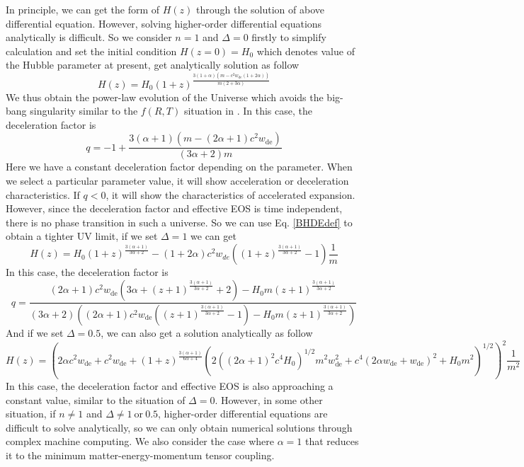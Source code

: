 \documentclass[a4paper,fleqn]{cas-sc}
\begin{document}
In principle, we can get the form of $H(z)$ through the solution of above differential equation. However, solving higher-order differential equations analytically is difficult. So we consider $n=1$ and $\Delta=0$ firstly to simplify calculation and set the initial condition $H(z=0)=H_0$ which denotes value of the Hubble parameter at present, get analytically solution as follow
\begin{equation}
    H(z)= H_0 (1+z)^{\frac{3 (1+\alpha) \left(m-c^2 w_\text{de}(1+2\alpha)\right)}{m(2+3\alpha)}}
\end{equation}
We thus obtain the power-law evolution of the Universe which avoids the big-bang singularity similar to the $f(R,T)$ situation in \cite{singhStatefinderDiagnosisHolographic2016}. In this case, the deceleration factor is
\begin{equation}
    q = -1+\frac{3 (\alpha +1) \left(m-(2 \alpha +1) c^2 w_\text{de}\right)}{(3 \alpha +2) m}
\end{equation}
Here we have a constant deceleration factor depending on the parameter. When we select a particular parameter value, it will show acceleration or deceleration characteristics. If $q<0$, it will show the characteristics of accelerated expansion. However, since the deceleration factor and effective EOS is time independent, there is no phase transition in such a universe. So we can use Eq. \eqref{BHDEdef} to obtain a tighter UV limit, if we set $\Delta=1$ we can get 
\begin{equation}
    H(z)= H_0 (1+z)^{\frac{3 (\alpha +1)}{3\alpha +2}}-(1+2 \alpha) c^2 w_{de} \left((1+z)^{\frac{3 (\alpha +1)}{3\alpha +2}}-1\right)\frac{1}{m}
\end{equation}
In this case, the deceleration factor is
\begin{equation}
    q=\frac{(2 \alpha +1) c^2 w_\text{de} \left(3 \alpha +(z+1)^{\frac{3 (\alpha +1)}{3 \alpha +2}}+2\right)-H_0 m (z+1)^{\frac{3 (\alpha +1)}{3 \alpha +2}}}{(3 \alpha +2) \left((2 \alpha +1) c^2 w_\text{de} \left((z+1)^{\frac{3 (\alpha +1)}{3 \alpha +2}}-1\right)-H_0 m (z+1)^{\frac{3 (\alpha +1)}{3 \alpha +2}}\right)}
\end{equation}
And if we set $\Delta=0.5$, we can also get a solution analytically as follow
\begin{equation}
    H(z)= \left(2 \alpha  c^2 w_\text{de}+c^2 w_\text{de}+(1+z)^{\frac{3 (\alpha +1)}{6 \alpha +4}}\left(2 ((2 \alpha +1)^2 c^4 H_0)^{1/2} m^2 w_\text{de}^2+c^4 (2 \alpha  w_\text{de}+w_\text{de})^2+H_0 m^2\right)^{1/2}\right)^2 \frac{1}{m^2}
\end{equation}
In this case, the deceleration factor and effective EOS is also approaching a constant value, similar to the situation of $\Delta = 0$.
However, in some other situation, if $n \neq 1$ and $\Delta \neq 1\  \text{or}\  0.5$, higher-order differential equations are difficult to solve analytically, so we can only obtain numerical solutions through complex machine computing. We also consider the case where $\alpha=1$ that reduces it to the minimum matter-energy-momentum tensor coupling.
\end{document}
